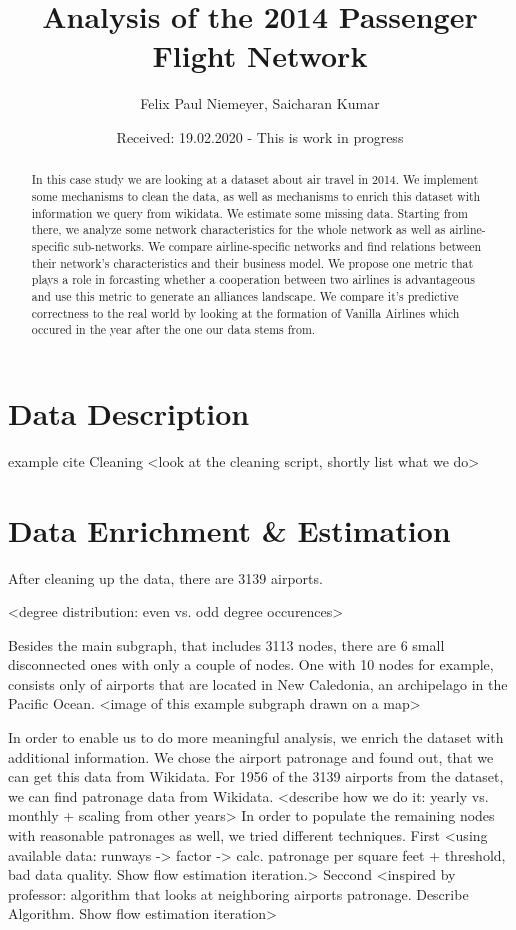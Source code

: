 \documentclass[twocolumn]{tum-article}
\title{Analysis of the 2014 Passenger Flight Network}
\author{Felix Paul Niemeyer\authormark{1},
	Saicharan Kumar\authormark{2}}
\affil[1]{felix.niemeyer@tum.de, MiM}
\affil[2]{saicharan.kumar@tum.de, MiM}
\date{Received: 19.02.2020 - This is work in progress}
\begin{document}
\maketitle

\begin{abstract}
	In this case study we are looking at a dataset about air travel in 2014. We implement some mechanisms to clean the data, as well as mechanisms to enrich this dataset with information we query from wikidata. We estimate some missing data. Starting from there, we analyze some network characteristics for the whole network as well as airline-specific sub-networks. We compare airline-specific networks and find relations between their network's characteristics and their business model. We propose one metric that plays a role in forcasting whether a cooperation between two airlines is advantageous and use this metric to generate an alliances landscape. We compare it's predictive correctness to the real world by looking at the formation of Vanilla Airlines which occured in the year after the one our data stems from. 
\end{abstract}

\section{Data Description}

example cite \cite{jirauschek20141}
Cleaning <look at the cleaning script, shortly list what we do>

\section{Data Enrichment \& Estimation}
After cleaning up the data, there are 3139 airports. 

<degree distribution: even vs. odd degree occurences>

Besides the main subgraph, that includes 3113 nodes, there are 6 small disconnected ones with only a couple of nodes.
One with 10 nodes for example, consists only of airports that are located in New Caledonia, an archipelago in the Pacific Ocean. 
<image of this example subgraph drawn on a map>

In order to enable us to do more meaningful analysis, we enrich the dataset with additional information. We chose the airport patronage and found out, that we can get this data from Wikidata. 
For 1956 of the 3139 airports from the dataset, we can find patronage data from Wikidata. 
<describe how we do it: yearly vs. monthly + scaling from other years>
In order to populate the remaining nodes with reasonable patronages as well, we tried different techniques. 
First <using available data: runways -> factor -> calc. patronage per square feet + threshold, bad data quality. Show flow estimation iteration.>
Seccond <inspired by professor: algorithm that looks at neighboring airports patronage. Describe Algorithm. Show flow estimation iteration>
\end{document}
